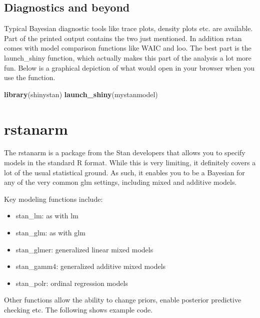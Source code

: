 \documentclass[]{book}
\newenvironment{Shaded}{\begin{snugshade}}{\end{snugshade}}
\newcommand{\KeywordTok}[1]{\textcolor[rgb]{0.13,0.29,0.53}{\textbf{{#1}}}}
\newcommand{\NormalTok}[1]{{#1}}
\providecommand{\tightlist}{%
  \setlength{\itemsep}{0pt}\setlength{\parskip}{0pt}}
\begin{document}
\subsection{Diagnostics and beyond}\label{diagnostics-and-beyond}

Typical Bayesian diagnostic tools like trace plots, density plots etc.
are available. Part of the printed output contains the two just
mentioned. In addition {rstan} comes with model comparison functions
like {WAIC} and {loo}. The best part is the {launch\_shiny} function,
which actually makes this part of the analysis a lot more fun. Below is
a graphical depiction of what would open in your browser when you use
the function.

\begin{Shaded}
\begin{Highlighting}[]
\KeywordTok{library}\NormalTok{(shinystan)}
\KeywordTok{launch_shiny}\NormalTok{(mystanmodel)}
\end{Highlighting}
\end{Shaded}

\section{rstanarm}\label{rstanarm}

The {rstanarm} is a package from the Stan developers that allows you to
specify models in the standard R
format.
While this is very limiting, it definitely covers a lot of the usual
statistical ground. As such, it enables you to be a Bayesian for any of
the very common glm settings, including mixed and additive models.

Key modeling functions include:

\begin{itemize}
\tightlist
\item
  {stan\_lm}: as with lm
\item
  {stan\_glm}: as with glm
\item
  {stan\_glmer}: generalized linear mixed models
\item
  {stan\_gamm4}: generalized additive mixed models
\item
  {stan\_polr}: ordinal regression models
\end{itemize}

Other functions allow the ability to change priors, enable posterior
predictive checking etc. The following shows example code.
\end{document}
